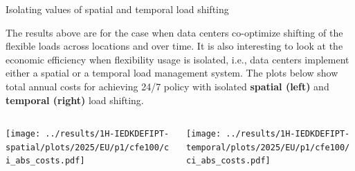\begin{frame}{Isolating values of spatial and temporal load shifting}
\label{isolated-hook}

  {\footnotesize
  The results above are for the case when data centers \alert{co-optimize} shifting of the flexible loads across locations and over time. It is also interesting to look at the economic efficiency when flexibility usage is isolated, i.e., data centers implement either a spatial or a temporal load management system. The plots below show total annual costs for achieving 24/7 policy with isolated {\bf spatial (left)} and {\bf temporal (right)} load shifting.

  \vspace{0.4cm} 
  \begin{columns}
    \begin{column}{7cm}
    \texttt{[image: ../results/1H-IEDKDEFIPT-spatial/plots/2025/EU/p1/cfe100/ci\_abs\_costs.pdf]}
    \end{column}
    
    \begin{column}{7cm}
    \texttt{[image: ../results/1H-IEDKDEFIPT-temporal/plots/2025/EU/p1/cfe100/ci\_abs\_costs.pdf]}
    \end{column}
  \end{columns}

  }
  
\end{frame}


